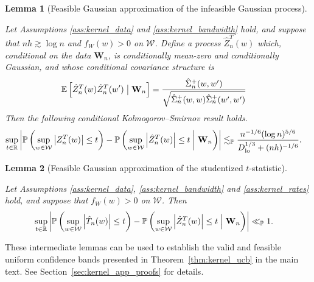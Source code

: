 \documentclass[11pt,lof]{puthesis}
\renewcommand{\P}{\ensuremath{\mathbb{P}}}
\newcommand{\R}{\ensuremath{\mathbb{R}}}
\newcommand{\E}{\ensuremath{\mathbb{E}}}
\newcommand{\bW}{\ensuremath{\mathbf{W}}}
\newcommand{\cW}{\ensuremath{\mathcal{W}}}
\newcommand{\Dl}{\ensuremath{D_{\textup{lo}}}}
\theoremstyle{break}
\newtheorem{lemma}{Lemma}[section]
\theoremstyle{proof}
\begin{document}
\begin{lemma}[Feasible Gaussian approximation
  of the infeasible Gaussian process]
  \label{lem:kernel_app_distributional_approx_feasible_gaussian}

  Let Assumptions \ref{ass:kernel_data} and \ref{ass:kernel_bandwidth}
  hold, and suppose that
  $n h \gtrsim \log n$ and $f_W(w) > 0$ on $\cW$.
  Define a process $\hat Z_n^T(w)$ which,
  conditional on the data $\bW_n$,
  is conditionally mean-zero and
  conditionally Gaussian, and whose
  conditional covariance structure is
  \begin{align*}
    \E\left[
      \hat Z_n^T(w) \hat Z_n^T(w')
    \bigm| \bW_n \right]
    &=
    \frac{\hat \Sigma_n^+(w,w')}
    {\sqrt{\hat \Sigma_n^+(w,w) \hat \Sigma_n^+(w',w')}}
  \end{align*}
  Then the following conditional
  Kolmogorov--Smirnov result holds.
  \begin{align*}
    \sup_{t \in \R}
    \left|
    \P\left(
      \sup_{w \in \cW}
      \left| Z_n^T(w) \right|
      \leq t
    \right)
    - \P\left(
      \sup_{w \in \cW}
      \left| \hat Z_n^T(w) \right|
      \leq t
      \biggm\vert \bW_n
    \right)
    \right|
    &\lesssim_\P
    \frac{n^{-1/6}(\log n)^{5/6}}
    {\Dl^{1/3} + (n h)^{-1/6}}.
  \end{align*}

\end{lemma}

\begin{lemma}[Feasible Gaussian approximation of the studentized $t$-statistic]
  \label{lem:kernel_app_feasible_gaussian_approx}

  Let Assumptions \ref{ass:kernel_data}, \ref{ass:kernel_bandwidth}
  and \ref{ass:kernel_rates} hold, and suppose that $f_W(w) > 0$ on $\cW$.
  Then
  \begin{align*}
    \sup_{t \in \R}
    \left|
    \P\left(
      \sup_{w \in \cW}
      \left| \hat T_n(w) \right|
      \leq t
    \right)
    - \P\left(
      \sup_{w \in \cW}
      \left| \hat Z_n^T(w) \right|
      \leq t
      \Bigm\vert \bW_n
    \right)
    \right|
    &\ll_\P
    1.
  \end{align*}

\end{lemma}

These intermediate lemmas can be used to establish the valid and feasible
uniform confidence bands presented in Theorem~\ref{thm:kernel_ucb} in the main
text. See Section~\ref{sec:kernel_app_proofs} for details.
\end{document}
